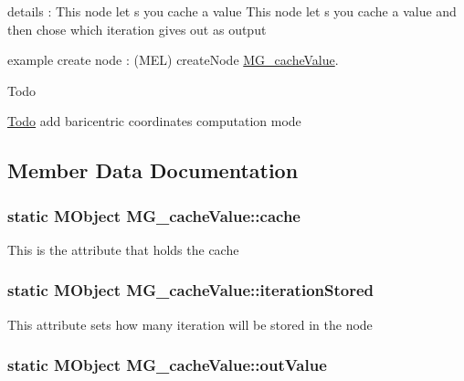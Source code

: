 details \-: This node let s you cache a value This node let s you cache a value and then chose which iteration gives out as output

example create node \-: (M\-E\-L) create\-Node \hyperlink{class_m_g__cache_value}{M\-G\-\_\-cache\-Value}.

\begin{DoxyRefDesc}{Todo}
\item[\hyperlink{todo__todo000005}{Todo}]add baricentric coordinates computation mode\end{DoxyRefDesc}


\subsection{Member Data Documentation}
\hypertarget{class_m_g__cache_value_af41d3e0480acf043362b219ccab05313}{
\subsubsection[{cache}]{\setlength{\rightskip}{0pt plus 5cm}static M\-Object M\-G\-\_\-cache\-Value\-::cache\hspace{0.3cm}{\ttfamily [static]}}}\label{class_m_g__cache_value_af41d3e0480acf043362b219ccab05313}
This is the attribute that holds the cache \hypertarget{class_m_g__cache_value_a2c30422a3a121f421f0c5e7fcb409848}{
\subsubsection[{iteration\-Stored}]{\setlength{\rightskip}{0pt plus 5cm}static M\-Object M\-G\-\_\-cache\-Value\-::iteration\-Stored\hspace{0.3cm}{\ttfamily [static]}}}\label{class_m_g__cache_value_a2c30422a3a121f421f0c5e7fcb409848}
This attribute sets how many iteration will be stored in the node \hypertarget{class_m_g__cache_value_ab5b43d3f3f79cc1dbf14d2351fda4ce6}{
\subsubsection[{out\-Value}]{\setlength{\rightskip}{0pt plus 5cm}static M\-Object M\-G\-\_\-cache\-Value\-::out\-Value\hspace{0.3cm}{\ttfamily [static]}}}\label{class_m_g__cache_value_ab5b43d3f3f79cc1dbf14d2351fda4ce6}
